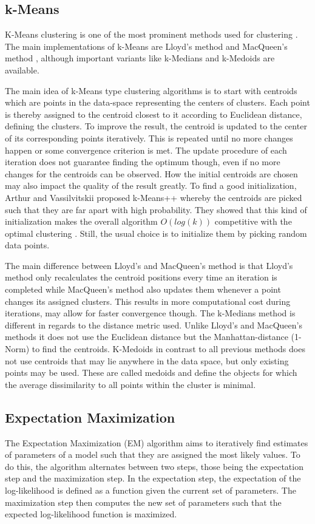 \documentclass[
	a4paper,
	english,
	twoside,
	openright,               
	11pt                            
	]{report}
\begin{document}
\subsection{k-Means}
K-Means clustering is one of the most prominent methods used for clustering \cite{Jin2010}. The main implementations of k-Means are Lloyd's method \cite{4031353} and MacQueen's method \cite{macqueen1967}, although important variants like k-Medians \cite{Dohan2015KmedianAT} and k-Medoids \cite{kmedoids}  are available.

The main idea of k-Means type clustering algorithms is to start with centroids which are points in the data-space representing the centers of clusters. Each point is thereby assigned to the centroid closest to it according to Euclidean distance, defining the clusters. To improve the result, the centroid is updated to the center of its corresponding points iteratively. This is repeated until no more changes happen or some convergence criterion is met. The update procedure of each iteration does not guarantee finding the optimum though, even if no more changes for the centroids can be observed. How the initial centroids are chosen may also impact the quality of the result greatly. To find a good initialization, Arthur and Vassilvitskii \cite{10.5555/1283383.1283494} proposed k-Means++ whereby the centroids are picked such that they are far apart with high probability. They showed that this kind of initialization makes the overall algorithm $O(log(k))$ competitive with the optimal clustering \cite{10.5555/1283383.1283494}. Still, the usual choice is to initialize them by picking random data points.

The main difference between Lloyd's and MacQueen's method is that Lloyd's method only recalculates the centroid positions every time an iteration is completed while MacQueen's method also updates them whenever a point changes its assigned clusters. This results in more computational cost during iterations, may allow for faster convergence though. The k-Medians method is different in regards to the distance metric used. Unlike Lloyd's and MacQueen's methods it does not use the Euclidean distance but the Manhattan-distance (1-Norm) to find the centroids. K-Medoids in contrast to all previous methods does not use centroids that may lie anywhere in the data space, but only existing points may be used. These are called medoids and define the objects for which the average dissimilarity to all points within the cluster is minimal.

\subsection{Expectation Maximization}
The Expectation Maximization (EM) algorithm \cite{10.2307/2984875} aims to iteratively find estimates of parameters of a model such that they are assigned the most likely values. To do this, the algorithm alternates between two steps, those being the expectation step and the maximization step. In the expectation step, the expectation of the log-likelihood is defined as a function given the current set of parameters. The maximization step then computes the new set of parameters such that the expected log-likelihood function is maximized.
\end{document}
